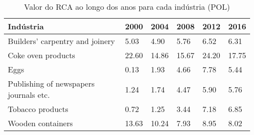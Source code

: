 \begin{table}
\centering
\caption{Valor do RCA ao longo dos anos para cada indústria (POL)}
\label{tab:ex3-tempo-POL}
\begin{tabular}{p{6cm}p{1.5cm}p{1.5cm}p{1.5cm}p{1.5cm}p{1.5cm}}
\toprule
                             Indústria &  2000 &  2004 &  2008 &  2012 &  2016 \\
\midrule
       Builders' carpentry and joinery &  5.03 &  4.90 &  5.76 &  6.52 &  6.31 \\
                    Coke oven products & 22.60 & 14.86 & 15.67 & 24.20 & 17.75 \\
                                  Eggs &  0.13 &  1.93 &  4.66 &  7.78 &  5.44 \\
Publishing of newspapers journals etc. &  1.24 &  1.74 &  4.47 &  5.90 &  5.76 \\
                      Tobacco products &  0.72 &  1.25 &  3.44 &  7.18 &  6.85 \\
                     Wooden containers & 13.63 & 10.24 &  7.93 &  8.95 &  8.02 \\
\bottomrule
\end{tabular}
\end{table}
